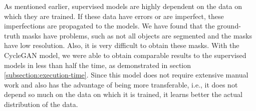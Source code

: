 As mentioned earlier, supervised models are highly dependent on the data on which they are trained. If these data have errors or are imperfect, these imperfections are propagated to the models. We have found that the ground-truth masks have problems, such as not all objects are segmented and the masks have low resolution. Also, it is very difficult to obtain these masks. With the CycleGAN model, we were able to obtain comparable results to the supervised models in less than half the time, as demonstrated in section \ref{subsection:execution-time}. Since this model does not require extensive manual work and also has the advantage of being more transferable, i.e., it does not depend so much on the data on which it is trained, it learns better the actual distribution of the data.